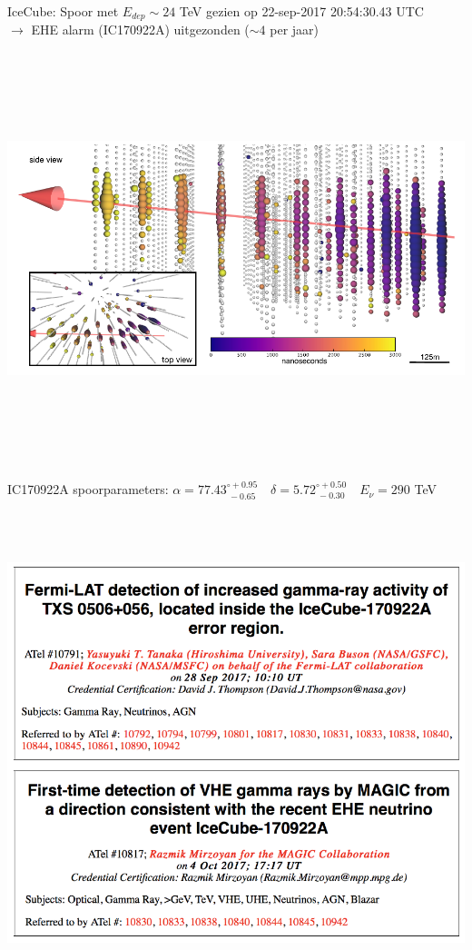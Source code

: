 \onecolumn
{\blue IceCube: Spoor met $E_{dep} \sim 24$ TeV gezien op 22-sep-2017 20:54:30.43 UTC}\\
$\rightarrow$ EHE alarm (IC170922A) uitgezonden ($\sim 4$ per jaar) 
\begin{center}
\includegraphics[keepaspectratio,height=12cm]{IC170922A-event}
\end{center}

\Tr
\onecolumn
IC170922A spoorparameters: $\alpha=77.43^{\circ +0.95}_{~-0.65} \quad \delta=5.72^{\circ +0.50}_{~-0.30} \quad E_{\nu}=290$ TeV
\begin{center}
\includegraphics[keepaspectratio,height=14cm]{IC170922A}
\end{center}

